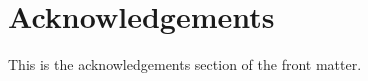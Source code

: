 

\chapter*{Acknowledgements} \label{acknowledgements}

This is the acknowledgements section of the front matter.

